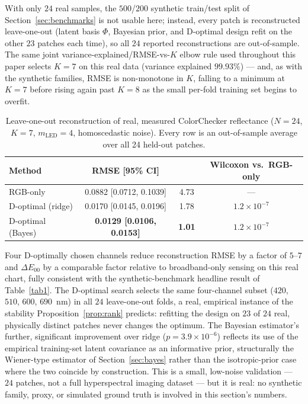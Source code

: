 \documentclass[11pt]{article}
\begin{document}
With only $24$ real samples, the $500$/$200$ synthetic train/test split of Section~\ref{sec:benchmarks} is not usable here; instead, every patch is reconstructed leave-one-out (latent basis $\Phi$, Bayesian prior, and D-optimal design refit on the other $23$ patches each time), so all $24$ reported reconstructions are out-of-sample. The same joint variance-explained/RMSE-vs-$K$ elbow rule used throughout this paper selects $K=7$ on this real data (variance explained $99.93\%$) --- and, as with the synthetic families, RMSE is non-monotone in $K$, falling to a minimum at $K=7$ before rising again past $K=8$ as the small per-fold training set begins to overfit.

\begin{table}[H]
\centering
\caption{Leave-one-out reconstruction of real, measured ColorChecker reflectance ($N=24$, $K=7$, $m_{\mathrm{LED}}=4$, homoscedastic noise). Every row is an out-of-sample average over all 24 held-out patches.\label{tab:cc}}
\begin{tabularx}{\textwidth}{lCCC}
\toprule
\textbf{Method} & \textbf{RMSE [95\% CI]} &  & \textbf{Wilcoxon}  \textbf{ vs.\ RGB-only}\\
\midrule
RGB-only & 0.0882 [0.0712, 0.1039] & 4.73 & ---\\
D-optimal (ridge) & 0.0170 [0.0145, 0.0196] & 1.78 & $1.2\times10^{-7}$\\
D-optimal (Bayes) & \textbf{0.0129 [0.0106, 0.0153]} & \textbf{1.01} & $1.2\times10^{-7}$\\
\bottomrule
\end{tabularx}
\end{table}

Four D-optimally chosen channels reduce reconstruction RMSE by a factor of $5$--$7$ and $\Delta E_{00}$ by a comparable factor relative to broadband-only sensing on this real chart, fully consistent with the synthetic-benchmark headline result of Table~\ref{tab1}. The D-optimal search selects the same four-channel subset ($420$, $510$, $600$, $690$~nm) in all $24$ leave-one-out folds, a real, empirical instance of the stability Proposition~\ref{prop:rank} predicts: refitting the design on $23$ of $24$ real, physically distinct patches never changes the optimum. The Bayesian estimator's further, significant improvement over ridge ($p=3.9\times10^{-6}$) reflects its use of the empirical training-set latent covariance as an informative prior, structurally the Wiener-type estimator of Section~\ref{sec:bayes} rather than the isotropic-prior case where the two coincide by construction. This is a small, low-noise validation --- $24$ patches, not a full hyperspectral imaging dataset --- but it is real: no synthetic family, proxy, or simulated ground truth is involved in this section's numbers.
\end{document}
